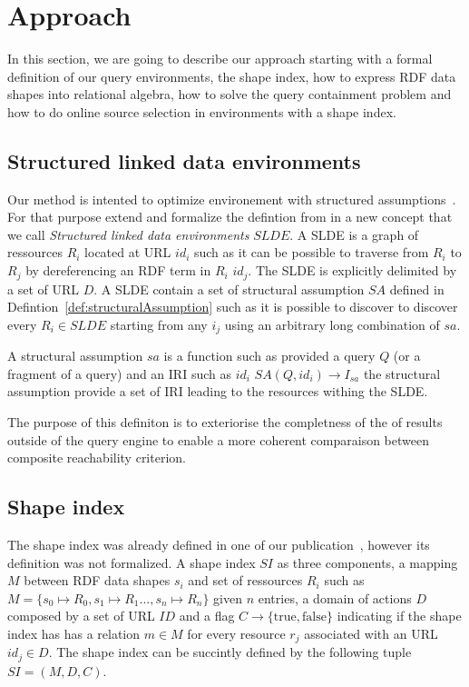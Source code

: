 \section{Approach}

In this section, we are going to describe our approach starting with a formal definition of our query environments,
the shape index, how to express RDF data shapes into relational algebra, how to solve the query containment problem
and how to do online source selection in environments with a shape index.

\subsection{Structured linked data environments}
Our method is intented to optimize environement with structured assumptions~\cite{Taelman2023}.
For that purpose extend and formalize the defintion from \citeauthor{Taelman2023} in a new concept that we call \emph{Structured linked data environments} $SLDE$.
A SLDE is a graph of ressources $R_i$ located at URL $id_i$ such as it can be possible to traverse from $R_i$ to $R_j$ by dereferencing an RDF term in $R_i$ $id_j$.
The SLDE is explicitly delimited by a set of URL $D$.
A SLDE contain a set of structural assumption $SA$ defined in Defintion~\ref{def:structuralAssumption} such as 
it is possible to discover to discover every $R_i \in SLDE$ starting from any $i_j$ using an arbitrary long combination of $sa$.


\begin{definition}\label{def:structuralAssumption}
   A structural assumption $sa$ is a function such as provided a query $Q$ (or a fragment of a query) and an IRI such as $id_i$ $SA(Q, id_i) \rightarrow I_{sa}$
   the structural assumption provide a set of IRI leading to the resources withing the SLDE.
\end{definition}

The purpose of this definiton is to exteriorise the completness of the of results outside of the query engine to enable a more coherent comparaison
between composite reachability criterion.

\subsection{Shape index}
The shape index was already defined in one of our publication~\cite{tam2024opportunitiesshapebasedoptimizationlink}, however its definition was not formalized.
A shape index $SI$ as three components, a mapping $M$ between RDF data shapes $s_i$ and set of ressources $R_i$ such as $M = \{s_0 \mapsto R_0, s_1 \mapsto R_1..., s_n \mapsto R_n\}$ given $n$ entries,
a domain of actions $D$ composed by a set of URL $ID$ and
a flag $C\rightarrow \{\mathrm{true}, \mathrm{false}\}$ indicating if the shape index has has a relation $m \in M$ for every resource $r_j$ associated with an URL $id_j \in D$. 
The shape index can be succintly defined by the following tuple $SI = (M, D, C)$.


